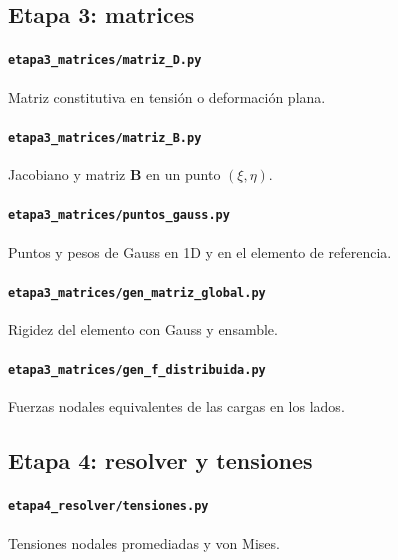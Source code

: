 \subsection*{Etapa 3: matrices}

\paragraph{\texttt{etapa3\_matrices/matriz\_D.py}} Matriz constitutiva en tensi\'on o deformaci\'on plana.


\paragraph{\texttt{etapa3\_matrices/matriz\_B.py}} Jacobiano y matriz $\mathbf{B}$ en un punto $(\xi,\eta)$.


\paragraph{\texttt{etapa3\_matrices/puntos\_gauss.py}} Puntos y pesos de Gauss en 1D y en el elemento de referencia.


\paragraph{\texttt{etapa3\_matrices/gen\_matriz\_global.py}} Rigidez del elemento con Gauss y ensamble.


\paragraph{\texttt{etapa3\_matrices/gen\_f\_distribuida.py}} Fuerzas nodales equivalentes de las cargas en los lados.


\subsection*{Etapa 4: resolver y tensiones}

\paragraph{\texttt{etapa4\_resolver/tensiones.py}} Tensiones nodales promediadas y von Mises.


